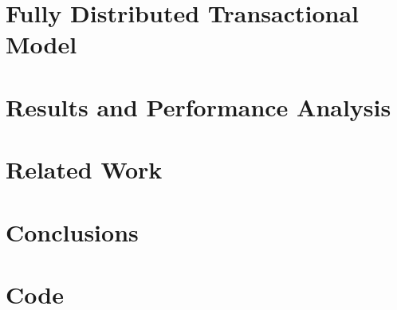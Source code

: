 \documentclass[12pt,a4paper,twoside]{book} %
\begin{document}
	\chapter{Fully Distributed Transactional Model}
	\label{chap:fdtm}
       
   	   \mbox{}
    
    \chapter{Results and Performance Analysis}
       
   	   \mbox{}	
		\thispagestyle{plain}
		\mbox{}
    \chapter{Related Work}
       
   	\mbox{}	
   \chapter{Conclusions}
   	
   	\newpage
   	\thispagestyle{plain}
   	\mbox{}

	
%	
	\cleardoublepage
	\renewcommand\bibname{References}
	
	
	\appendix
		\chapter{Code}
		    \label{app:code}
			
\end{document}
